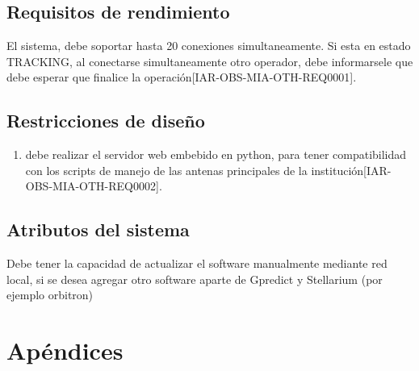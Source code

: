 \documentclass[12pt,a4paper, twosite]{article}
\begin{document}
	\subsection{Requisitos de rendimiento}
	\label{sec:org94bc543}
	
	El sistema, debe soportar hasta 20 conexiones simultaneamente. Si esta en estado TRACKING, al conectarse simultaneamente otro operador, debe informarsele que debe esperar que finalice la operación[IAR-OBS-MIA-OTH-REQ0001]. 
	
	\subsection{Restricciones de diseño}
	\label{sec:org49fe900}
	\begin{enumerate}
		
	\item debe realizar el servidor web embebido en python, para tener compatibilidad con los scripts de manejo de las antenas principales de la institución[IAR-OBS-MIA-OTH-REQ0002]. 
	\end{enumerate}

	\subsection{Atributos del sistema}
	\label{sec:orgd0babc0}
	Debe tener la capacidad de actualizar el software manualmente mediante red local, si se desea agregar otro software aparte de Gpredict y Stellarium (por ejemplo orbitron)
	
\section{Apéndices}
\label{sec:org75cea03}
	
\end{document}
